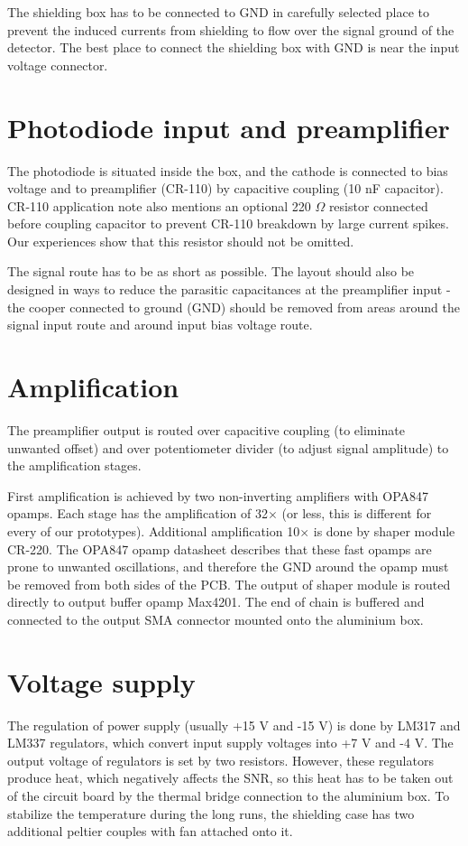 \par
The shielding box has to be connected to GND in carefully selected place to prevent the induced currents from shielding to flow over the signal ground of the detector. The best place to connect the shielding box with GND is near the input voltage connector.


\section{Photodiode input and preamplifier}
The photodiode is situated inside the box, and the cathode is connected to bias voltage and to preamplifier (CR-110) by capacitive coupling (10 nF capacitor). CR-110 application note also mentions an optional 220 $\Omega$ resistor connected before coupling capacitor to prevent CR-110 breakdown by large current spikes. Our experiences show that this resistor should not be omitted.

\par
The signal route has to be as short as possible. The layout should also be designed in ways to reduce the parasitic capacitances at the preamplifier input - the cooper connected to ground (GND) should be removed from areas around the signal input route and around input bias voltage route. 

\section{Amplification}
The preamplifier output is routed over capacitive coupling (to eliminate unwanted offset) and over potentiometer divider (to adjust signal amplitude) to the amplification stages. 

First amplification is achieved by two non-inverting amplifiers with OPA847 opamps. Each stage has the amplification of 32$\times$ (or less, this is different for every of our prototypes). Additional amplification 10$\times$ is done by shaper module CR-220. The OPA847 opamp datasheet \cite{OPA847} describes that these fast opamps are prone to unwanted oscillations, and therefore the GND around the opamp must be removed from both sides of the PCB. The output of shaper module is routed directly to output buffer opamp Max4201. The end of chain is buffered and connected to the output SMA connector mounted onto the aluminium box.


\section{Voltage supply}
The regulation of power supply (usually +15 V and -15 V) is done by LM317 and LM337 regulators, which convert input supply voltages into +7 V and -4 V. The output voltage of regulators is set by two resistors. However, these regulators produce heat, which negatively affects the SNR, so this heat has to be taken out of the circuit board by the thermal bridge connection to the aluminium box. To stabilize the temperature during the long runs, the shielding case has two additional peltier couples with fan attached onto it.

